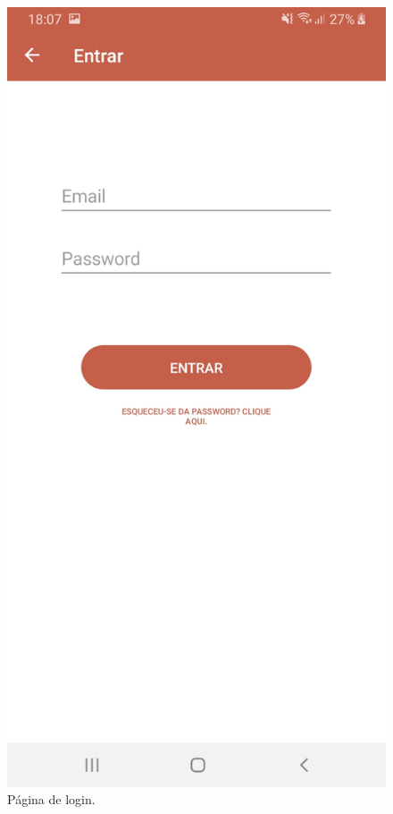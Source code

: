 \begin{figure}[H]
\centering
\includegraphics[width=0.5\linewidth]{images/entrar.jpg}
\caption{Página de login.}
\end{figure}